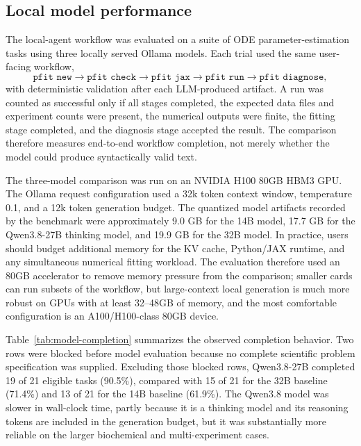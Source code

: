 
\subsection{Local model performance}

The local-agent workflow was evaluated on a suite of ODE parameter-estimation
tasks using three locally served Ollama models.  Each trial used the same
user-facing workflow,
\[
\texttt{pfit new} \rightarrow \texttt{pfit check} \rightarrow
\texttt{pfit jax} \rightarrow \texttt{pfit run} \rightarrow
\texttt{pfit diagnose},
\]
with deterministic validation after each LLM-produced artifact.  A run was
counted as successful only if all stages completed, the expected data files and
experiment counts were present, the numerical outputs were finite, the fitting
stage completed, and the diagnosis stage accepted the result.  The comparison
therefore measures end-to-end workflow completion, not merely whether the model
could produce syntactically valid text.

The three-model comparison was run on an NVIDIA H100 80GB HBM3 GPU.  The
Ollama request configuration used a 32k token context window, temperature
0.1, and a 12k token generation budget.  The quantized model artifacts recorded
by the benchmark were approximately 9.0 GB for the 14B model, 17.7 GB for the
Qwen3.8-27B thinking model, and 19.9 GB for the 32B model.  In practice, users
should budget additional memory for the KV cache, Python/JAX runtime, and any
simultaneous numerical fitting workload.  The evaluation therefore used an
80GB accelerator to remove memory pressure from the comparison; smaller cards
can run subsets of the workflow, but large-context local generation is much
more robust on GPUs with at least 32--48GB of memory, and the most comfortable
configuration is an A100/H100-class 80GB device.

Table~\ref{tab:model-completion} summarizes the observed completion behavior.
Two rows were blocked before model evaluation because no complete scientific
problem specification was supplied.  Excluding those blocked rows, Qwen3.8-27B
completed 19 of 21 eligible tasks (90.5\%), compared with 15 of 21 for the
32B baseline (71.4\%) and 13 of 21 for the 14B baseline (61.9\%).  The
Qwen3.8 model was slower in wall-clock time, partly because it is a thinking
model and its reasoning tokens are included in the generation budget, but it
was substantially more reliable on the larger biochemical and multi-experiment
cases.

